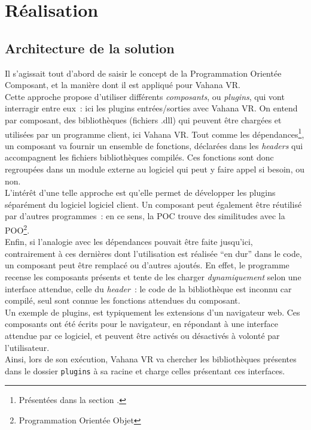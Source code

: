 \section{Réalisation}
\subsection{Architecture de la solution}
Il s'agissait tout d'abord de saisir le concept de la Programmation Orientée Composant, et la manière
dont il est appliqué pour Vahana VR.\\
Cette approche propose d'utiliser différents \emph{composants}, ou \textit{plugins},
qui vont interragir entre eux~: ici les plugins entrées/sorties avec Vahana VR. On entend
par composant, des bibliothèques (fichiers .dll) qui peuvent être chargées et utilisées
par un programme client, ici Vahana VR. Tout comme les dépendances\footnote{Présentées dans 
la section .}, un composant va fournir un ensemble
de fonctions, déclarées dans les \textit{headers} qui accompagnent les
fichiers bibliothèques compilés. Ces fonctions sont donc regroupées dans un module externe
au logiciel qui peut y faire appel si besoin, ou non.\\
L'intérêt d'une telle approche est qu'elle permet de développer les plugins séparément du logiciel
logiciel client. Un composant peut également être réutilisé par d'autres programmes~: en ce sens, la POC trouve
des similitudes avec la POO\footnote{Programmation Orientée Objet}.\\
Enfin, si l'analogie avec les dépendances pouvait être faite jusqu'ici, contrairement à ces
dernières dont l'utilisation est réalisée \enquote{en dur} dans le code, un composant
peut être remplacé ou d'autres ajoutés. En effet, le programme recense les composants
présents et tente de les charger \emph{dynamiquement} selon une interface attendue, celle du
\textit{header}~: le code de la bibliothèque est inconnu car compilé, seul sont
connue les fonctions attendues du composant.\\
Un exemple de plugins, est typiquement les extensions d'un navigateur web. Ces composants
ont été écrits pour le navigateur, en répondant à une interface attendue par ce logiciel,
et peuvent être activés ou désactivés à volonté par l'utilisateur.\\
\newline
Ainsi, lors de son exécution, Vahana VR va chercher les bibliothèques présentes dans le dossier
\texttt{plugins} à sa racine et charge celles présentant ces interfaces.\\
\newline

